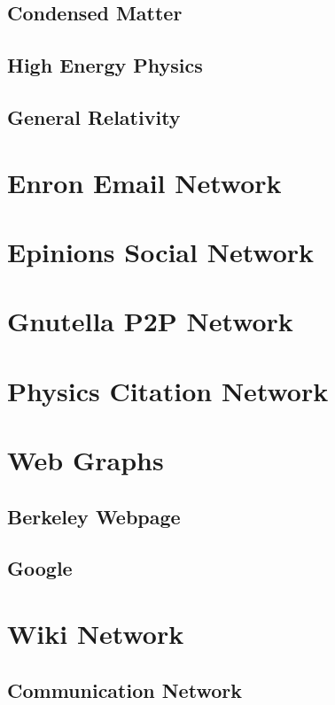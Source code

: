 \documentclass[phd,tocprelim]{cornell}
\begin{document}
\subsection{Condensed Matter}

\subsection{High Energy Physics}

\subsection{General Relativity}



\section{Enron Email Network}

\section{Epinions Social Network}

\section{Gnutella P2P Network}

\section{Physics Citation Network}

\section{Web Graphs}

\subsection{Berkeley Webpage}

\subsection{Google}


\section{Wiki Network}

\subsection{Communication Network}
\end{document}
